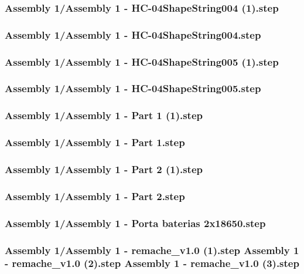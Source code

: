 \documentclass[a4paper,12pt]{article}
\begin{document}
\begin{lstlising}[language=C++]
\subsubsection{Assembly 1/Assembly 1 - HC-04ShapeString004 (1).step}

\subsubsection{Assembly 1/Assembly 1 - HC-04ShapeString004.step}

\subsubsection{Assembly 1/Assembly 1 - HC-04ShapeString005 (1).step}

\subsubsection{Assembly 1/Assembly 1 - HC-04ShapeString005.step}

\subsubsection{Assembly 1/Assembly 1 - Part 1 (1).step}

\subsubsection{Assembly 1/Assembly 1 - Part 1.step}

\subsubsection{Assembly 1/Assembly 1 - Part 2 (1).step}

\subsubsection{Assembly 1/Assembly 1 - Part 2.step}

\subsubsection{Assembly 1/Assembly 1 - Porta baterias 2x18650.step}

\subsubsection{Assembly 1/Assembly 1 - remache_v1.0 (1).step          Assembly 1 - remache_v1.0 (2).step          Assembly 1 - remache_v1.0 (3).step}


\end{lstlising}
\end{document}
